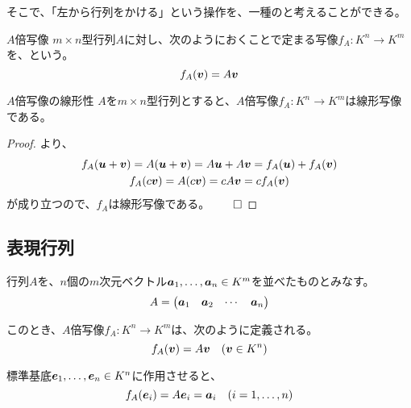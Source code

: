 \documentclass[../../../topic_linear-algebra]{subfiles}
\begin{document}
そこで、「左から行列をかける」という操作を、一種のと考えることができる。

\begin{definition*}{$A$倍写像}
  $m \times n$型行列$A$に対し、次のようにおくことで定まる写像$f_A \colon K^n \to K^m$を、という。
  \begin{equation*}
    f_A (\vb*{v}) = A \vb*{v}
  \end{equation*}
\end{definition*}

\begin{theorem*}{$A$倍写像の線形性}
  $A$を$m \times n$型行列とすると、$A$倍写像$f_A\colon K^n \to K^m$は線形写像である。
\end{theorem*}

\begin{proof}
  より、
  \begin{gather*}
    f_A(\vb*{u} + \vb*{v}) = A(\vb*{u} + \vb*{v}) = A\vb*{u} + A\vb*{v} = f_A(\vb*{u}) + f_A(\vb*{v}) \\
    f_A(c\vb*{v}) = A(c\vb*{v}) = cA\vb*{v} = cf_A(\vb*{v})
  \end{gather*}
  が成り立つので、$f_A$は線形写像である。$\qed$
\end{proof}

\subsection{表現行列}

行列$A$を、$n$個の$m$次元ベクトル$\vb*{a}_1, \ldots, \vb*{a}_n \in K^m$を並べたものとみなす。
\begin{equation*}
  A = \begin{pmatrix}
    \vb*{a}_1 & \vb*{a}_2 & \cdots & \vb*{a}_n
  \end{pmatrix}
\end{equation*}

このとき、$A$倍写像$f_A\colon K^n \to K^m$は、次のように定義される。
\begin{equation*}
  f_A(\vb*{v}) = A \vb*{v} \quad (\vb*{v} \in K^n)
\end{equation*}
  
標準基底$\vb*{e}_1, \ldots, \vb*{e}_n \in K^n$に作用させると、
\begin{equation*}
  f_A(\vb*{e}_i) = A \vb*{e}_i = \vb*{a}_i \quad (i = 1, \ldots, n)
\end{equation*}
\end{document}
